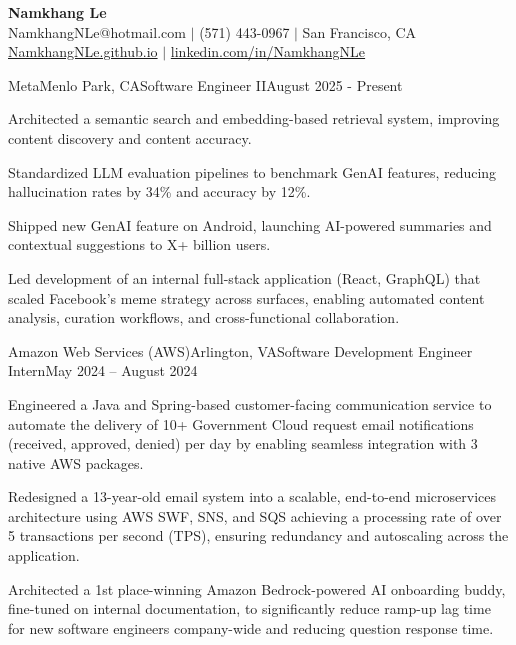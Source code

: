 \documentclass{article}
\begin{document}
\thispagestyle{empty}

\begin{center}
    \textbf{\LARGE Namkhang Le} \\
    NamkhangNLe@hotmail.com $|$ (571) 443-0967 $|$ San Francisco, CA \\
    \href{https://namkhangnle.github.io/}{NamkhangNLe.github.io} $|$ \href{https://www.linkedin.com/in/namkhangnle/}{linkedin.com/in/NamkhangNLe}
\end{center}

\begin{flushleft}


\begin{experience}{Meta}{Menlo Park, CA}{Software Engineer II}{August 2025 - Present}
       \item Architected a semantic search and embedding-based retrieval system,  improving content discovery and content accuracy.
       \item Standardized LLM evaluation pipelines to benchmark GenAI features, reducing hallucination rates by 34\% and accuracy by 12\%.
       \item Shipped new GenAI feature on Android, launching AI-powered summaries and contextual suggestions to X+ billion users.
       \item Led development of an internal full-stack application (React, GraphQL) that scaled Facebook’s meme strategy across surfaces, enabling automated content analysis, curation workflows, and cross-functional collaboration.
    \end{experience}
    
    \begin{experience}{Amazon Web Services (AWS)}{Arlington, VA}{Software Development Engineer Intern}{May 2024 -- August 2024}
        \item Engineered a Java and Spring-based customer-facing communication service to automate the delivery of 10+ Government Cloud request email notifications (received, approved, denied) per day by enabling seamless integration with 3 native AWS packages.
        \item Redesigned a 13-year-old email system into a scalable, end-to-end microservices architecture using AWS SWF, SNS, and SQS achieving a processing rate of over 5 transactions per second (TPS), ensuring redundancy and autoscaling across the application.
        \item Architected a 1st place-winning Amazon Bedrock-powered AI onboarding buddy, fine-tuned on internal documentation, to significantly reduce ramp-up lag time for new software engineers company-wide and reducing question response time.


\end{experience}
\end{flushleft}
\end{document}
